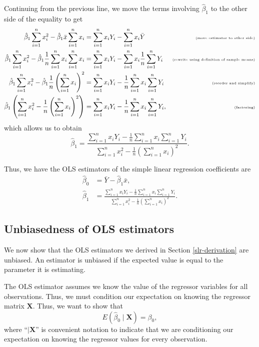 \documentclass[
]{book}
\theoremstyle{definition}
\theoremstyle{definition}
\theoremstyle{definition}
\theoremstyle{definition}
\theoremstyle{remark}
\begin{document}
Continuing from the previous line, we move the terms involving \(\hat{\beta}_1\) to the other side of the equality to get
\[
\begin{aligned}
\hat\beta_1\sum_{i=1}^n x_i^2-\hat\beta_1\bar x\sum_{i=1}^n x_i &=\sum_{i=1}^n x_iY_i -\sum_{i=1}^n x_i\bar Y & \tiny\text{(move estimator to other side)}\\
\hat\beta_1\sum_{i=1}^n x_i^2-\hat\beta_1\frac{1}{n}\sum_{i=1}^n  x_i\sum_{i=1}^n x_i&=\sum_{i=1}^n x_iY_i -\sum_{i=1}^n x_i\frac{1}{n}\sum_{i=1}^n  Y_i  &\tiny\text{(rewrite using definition of sample means)} \\
\hat\beta_1\sum_{i=1}^n x_i^2-\hat\beta_1\frac{1}{n}\left(\sum_{i=1}^n  x_i\right)^2 &=\sum_{i=1}^n x_iY_i -\frac{1}{n}\sum_{i=1}^n x_i\sum_{i=1}^n  Y_i  & \tiny\text{(reorder and simplify)} \\
\hat\beta_1\left(\sum_{i=1}^n x_i^2-\frac{1}{n}\left(\sum_{i=1}^n  x_i\right)^2\right)&=\sum_{i=1}^n x_iY_i -\frac{1}{n}\sum_{i=1}^n x_i\sum_{i=1}^n  Y_i, & \tiny\text{(factoring)}\\
\end{aligned}
\]
which allows us to obtain
\[
\hat\beta_1=\frac{\sum_{i=1}^n x_iY_i -\frac{1}{n}\sum_{i=1}^n x_i\sum_{i=1}^n  Y_i}{\sum_{i=1}^n x_i^2-\frac{1}{n}\left(\sum_{i=1}^n  x_i\right)^2}.
\]

Thus, we have the OLS estimators of the simple linear regression coefficients are
\[
\begin{aligned}
\hat\beta_0 &= \bar Y-\hat\beta_1\bar x, \\
\hat\beta_1 & =\frac{\sum_{i=1}^n x_iY_i -\frac{1}{n}\sum_{i=1}^n x_i\sum_{i=1}^n Y_i}{\sum_{i=1}^n x_i^2-\frac{1}{n}\left(\sum_{i=1}^n x_i\right)^2}.
\end{aligned}
\]

\hypertarget{unbiasedness-of-ols-estimators}{%
\subsection{Unbiasedness of OLS estimators}\label{unbiasedness-of-ols-estimators}}

We now show that the OLS estimators we derived in Section \ref{slr-derivation} are unbiased. An estimator is unbiased if the expected value is equal to the parameter it is estimating.

The OLS estimator assumes we know the value of the regressor variables for all observations. Thus, we must condition our expectation on knowing the regressor matrix \(\mathbf{X}\). Thus, we want to show that
\[
E(\hat{\beta}_0\mid \mathbf{X})=\beta_0,
\]
where ``\(\mid \mathbf{X}\)'' is convenient notation to indicate that we are conditioning our expectation on knowing the regressor values for every observation.
\end{document}
